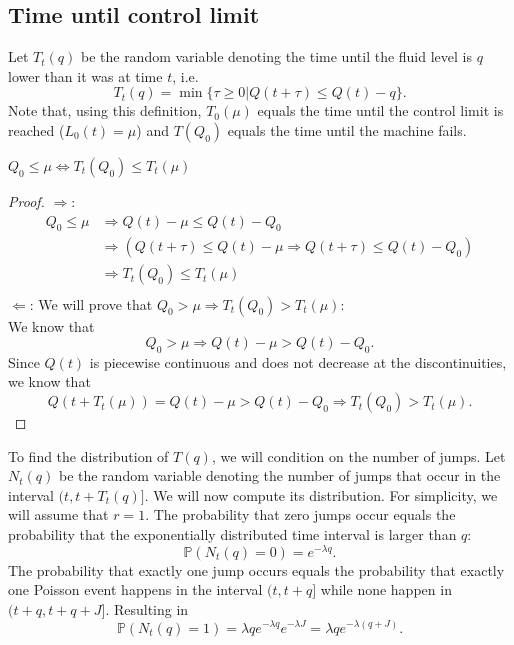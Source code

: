 \subsection{Time until control limit}
Let $T_t(q)$ be the random variable denoting the time until the fluid level is $q$ lower than it was at time $t$, i.e.
$$
T_t(q)=\min\{\tau\geq0|Q(t+\tau)\leq Q(t)-q\}.
$$
Note that, using this definition, $T_0(\mu)$ equals the time until the control limit is reached ($L_0(t)=\mu$) and $T(Q_0)$ equals the time until the machine fails.
\begin{lemma}
$Q_0\leq\mu\Leftrightarrow T_t(Q_0)\leq T_t(\mu)$
\end{lemma}
\begin{proof}
$\Rightarrow$: 
\begin{equation}
\begin{split}
Q_0\leq\mu&\Rightarrow Q(t)-\mu\leq Q(t)-Q_0\\
&\Rightarrow (Q(t+\tau)\leq Q(t)-\mu\Rightarrow Q(t+\tau)\leq Q(t)-Q_0)\\
&\Rightarrow T_t(Q_0)\leq T_t(\mu)\\
\end{split}
\end{equation}
$\Leftarrow$: We will prove that $Q_0>\mu\Rightarrow T_t(Q_0)> T_t(\mu)$:\\
We know that
$$
Q_0>\mu\Rightarrow Q(t)-\mu > Q(t)-Q_0.
$$
Since $Q(t)$ is piecewise continuous and does not decrease at the discontinuities, we know that 
$$
Q(t+T_t(\mu))=Q(t)-\mu>Q(t)-Q_0\Rightarrow T_t(Q_0)> T_t(\mu).
$$
\end{proof}

To find the distribution of $T(q)$, we will condition on the number of jumps.
Let $N_t(q)$ be the random variable denoting the number of jumps that occur in the interval $(t,t+T_t(q)]$.
We will now compute its distribution.
For simplicity, we will assume that $r=1$.
The probability that zero jumps occur equals the probability that the exponentially distributed time interval is larger than $q$:
$$
\mathbb{P}(N_t(q)=0)=e^{-\lambda q}.
$$
The probability that exactly one jump occurs equals the probability that exactly one Poisson event happens in the interval $(t,t+q]$ while none happen in $(t+q,t+q+J]$. Resulting in
$$
\mathbb{P}(N_t(q)=1)=\lambda q e^{-\lambda q} e^{-\lambda J}=\lambda q e^{-\lambda (q+J)}.
$$

